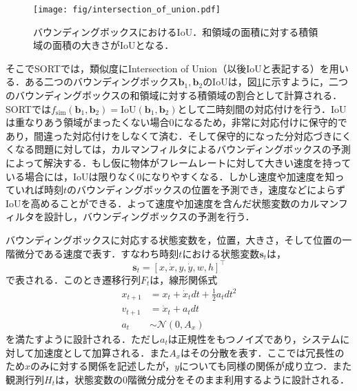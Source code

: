     \begin{figure}[t]
        \centering
        \texttt{[image: fig/intersection\_of\_union.pdf]}
        \caption[バウンディングボックスにおけるIoU]{バウンディングボックスにおけるIoU．和領域の面積に対する積領域の面積の大きさがIoUとなる．}
        \label{fig:intersection_of_union}
    \end{figure}

    そこでSORTでは，類似度にIntersection of Union（以後IoUと表記する）を用いる．ある二つのバウンディングボックス$\bm{b}_1, \bm{b}_2$のIoUは，図\ref{fig:intersection_of_union}に示すように，二つのバウンディングボックスの和領域に対する積領域の割合として計算される．SORTでは$f_{\text{sim}}(\bm{b}_1, \bm{b}_2) = \text{IoU}(\bm{b}_1, \bm{b}_2)$として二時刻間の対応付けを行う．IoUは重なりあう領域がまったくない場合$0$になるため，非常に対応付けに保守的であり，間違った対応付けをしなくて済む．そして保守的になった分対応づきにくくなる問題に対しては，カルマンフィルタによるバウンディングボックスの予測によって解決する．もし仮に物体がフレームレートに対して大きい速度を持っている場合には，IoUは限りなく0になりやすくなる．しかし速度や加速度を知っていれば時刻$t$のバウンディングボックスの位置を予測でき，速度などによらずIoUを高めることができる．よって速度や加速度を含んだ状態変数のカルマンフィルタを設計し，バウンディングボックスの予測を行う．

    バウンディングボックスに対応する状態変数を，位置，大きさ，そして位置の一階微分である速度で表す．すなわち時刻$t$における状態変数$\bm{s}_t$は，
    \begin{equation}
        \label{eq:sort_state_vector}
        \bm{s}_t = \left[x, \dot{x}, y, \dot{y}, w, h\right]^{\top}
    \end{equation}
    で表される．このとき遷移行列$F_t$は，線形関係式
    \begin{equation}
        \label{eq:sort_transition}
        \begin{aligned}
            x_{t+1} &= x_t + \dot{x}_t dt + \frac{1}{2} a_t dt^2
            \\v_{t+1} &= \dot{x}_t + a_t dt
            \\a_t &\sim \mathcal{N}(0, A_x)
        \end{aligned}
    \end{equation}
    を満たすように設計される．ただし$a_t$は正規性をもつノイズであり，システムに対して加速度として加算される．また$A_x$はその分散を表す．ここでは冗長性のため$x$のみに対する関係を記述したが，$y$についても同様の関係が成り立つ．また観測行列$H_t$は，状態変数の$0$階微分成分をそのまま利用するように設計される．


